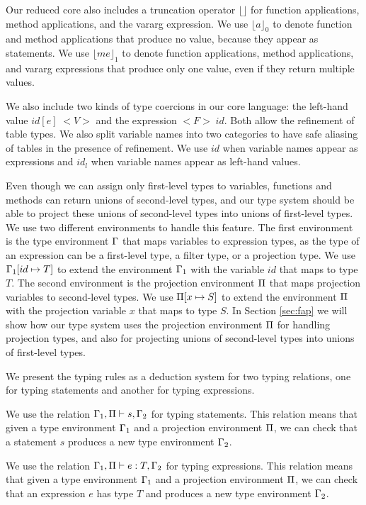 Our reduced core also includes a truncation operator $\lfloor \rfloor$ for
function applications, method applications, and the vararg expression.
We use $\lfloor a \rfloor_{0}$ to denote function and method applications
that produce no value, because they appear as statements.
We use $\lfloor me \rfloor_{1}$ to denote function applications,
method applications, and vararg expressions that produce only one value,
even if they return multiple values.

We also include two kinds of type coercions in our core language:
the left-hand value $id[e] \; {<}V{>}$ and the expression ${<}F{>} \;id$.
Both allow the refinement of table types.
We also split variable names into two categories to have safe aliasing
of tables in the presence of refinement.
We use $id$ when variable names appear as expressions and $id_{l}$ when
variable names appear as left-hand values.

Even though we can assign only first-level types to variables,
functions and methods can return unions of second-level types,
and our type system should be able to project these unions of
second-level types into unions of first-level types.
We use two different environments to handle this feature.
The first environment is the type environment $\Gamma$ that maps
variables to expression types, as the type of an expression can
be a first-level type, a filter type, or a projection type.
We use $\Gamma_{1}[id \mapsto T]$ to extend the environment $\Gamma_{1}$
with the variable $id$ that maps to type $T$.
The second environment is the projection environment $\Pi$ that
maps projection variables to second-level types.
We use $\Pi[x \mapsto S]$ to extend the environment $\Pi$
with the projection variable $x$ that maps to type $S$.
In Section \ref{sec:fap} we will show how our type system uses the
projection environment $\Pi$ for handling projection types,
and also for projecting unions of second-level types into
unions of first-level types.

We present the typing rules as a deduction system for two typing relations,
one for typing statements and another for typing expressions.

We use the relation $\Gamma_{1}, \Pi \vdash s, \Gamma_{2}$ for typing statements.
This relation means that given a type environment $\Gamma_{1}$
and a projection environment $\Pi$, we can check that a statement $s$
produces a new type environment $\Gamma_{2}$.

We use the relation $\Gamma_{1}, \Pi \vdash e : T, \Gamma_{2}$ for typing expressions.
This relation means that given a type environment $\Gamma_{1}$
and a projection environment $\Pi$, we can check that an expression $e$ has
type $T$ and produces a new type environment $\Gamma_{2}$.

